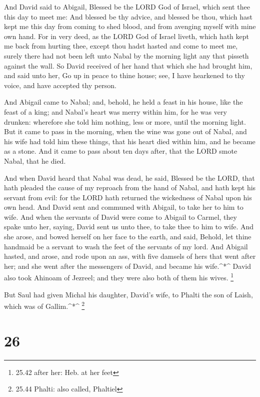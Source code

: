 And David said to Abigail, Blessed be the LORD God of
Israel, which sent thee this day to meet me:  And blessed
be thy advice, and blessed be thou, which hast kept me this day from
coming to shed blood, and from avenging myself with mine own hand.
 For in very deed, as the LORD God of Israel liveth, which
hath kept me back from hurting thee, except thou hadst hasted and come
to meet me, surely there had not been left unto Nabal by the morning
light any that pisseth against the wall.  So David received
of her hand that which she had brought him, and said unto her, Go up in
peace to thine house; see, I have hearkened to thy voice, and have
accepted thy person.

 And Abigail came to Nabal; and, behold, he held a feast in
his house, like the feast of a king; and Nabal's heart was merry within
him, for he was very drunken: wherefore she told him nothing, less or
more, until the morning light.  But it came to pass in the
morning, when the wine was gone out of Nabal, and his wife had told him
these things, that his heart died within him, and he became as a stone.
 And it came to pass about ten days after, that the LORD
smote Nabal, that he died.

 And when David heard that Nabal was dead, he said, Blessed
be the LORD, that hath pleaded the cause of my reproach from the hand of
Nabal, and hath kept his servant from evil: for the LORD hath returned
the wickedness of Nabal upon his own head. And David sent and communed
with Abigail, to take her to him to wife.  And when the
servants of David were come to Abigail to Carmel, they spake unto her,
saying, David sent us unto thee, to take thee to him to wife.
 And she arose, and bowed herself on her face to the earth,
and said, Behold, let thine handmaid be a servant to wash the feet of
the servants of my lord.  And Abigail hasted, and arose,
and rode upon an ass, with five damsels of hers that went after her; and
she went after the messengers of David, and became his wife.\^{}*\^{}
 David also took Ahinoam of Jezreel; and they were also
both of them his wives. \footnote{25.42 after her: Heb. at her feet}

 But Saul had given Michal his daughter, David's wife, to
Phalti the son of Laish, which was of Gallim.\^{}*\^{} \footnote{25.44
  Phalti: also called, Phaltiel}

\hypertarget{section-25}{%
\section{26}\label{section-25}}

